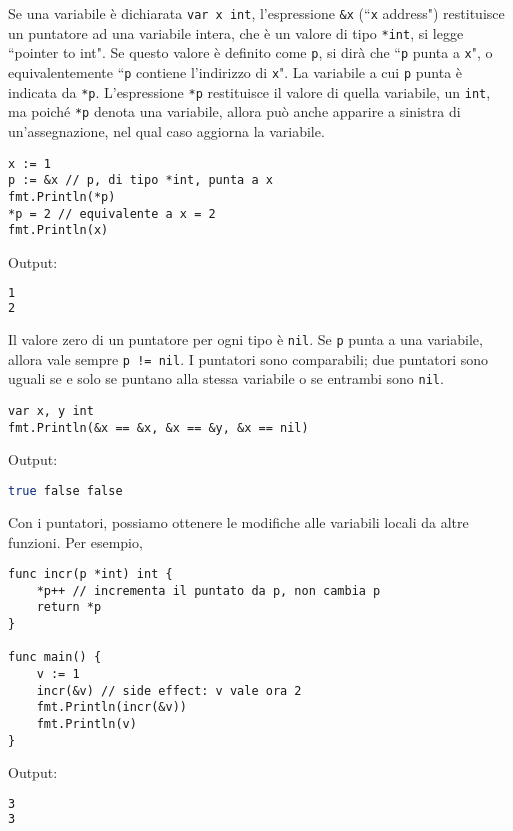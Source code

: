 \documentclass[../../../thesis.tex]{subfiles}
\begin{document}
    Se una variabile è dichiarata \verb"var x int", l'espressione \verb"&x" (``\verb"x" address") restituisce un puntatore ad una variabile intera, che è un valore di tipo \verb"*int", si legge ``pointer to int".
    Se questo valore è definito come \verb"p", si dirà che ``\verb"p" punta a \verb"x"", o equivalentemente ``\verb"p" contiene l'indirizzo di \verb"x"". La variabile a cui \verb"p" punta è indicata da \verb"*p".
    L'espressione \verb"*p" restituisce il valore di quella variabile, un \verb"int", ma poiché \verb"*p" denota una variabile, allora può anche apparire a sinistra di un'assegnazione, nel qual caso aggiorna la variabile.
    \begin{lstlisting}[frame = single, label = {lst:lstlisting1-3-2.1}]
x := 1
p := &x // p, di tipo *int, punta a x
fmt.Println(*p)
*p = 2 // equivalente a x = 2
fmt.Println(x)
    \end{lstlisting}
    Output:
    \begin{lstlisting}[language = bash, frame = L, label = {lst:lstlisting1-3-2.2}]
1
2
    \end{lstlisting}
    Il valore zero di un puntatore per ogni tipo è \verb"nil".
    Se \verb"p" punta a una variabile, allora vale sempre \verb"p != nil".
    I puntatori sono comparabili;
    due puntatori sono uguali se e solo se puntano alla stessa variabile o se entrambi sono \verb"nil".
    \begin{lstlisting}[frame = single, label = {lst:lstlisting1-3-2.3}]
var x, y int
fmt.Println(&x == &x, &x == &y, &x == nil)
    \end{lstlisting}
    Output:
    \begin{lstlisting}[language = bash, frame = L, label = {lst:lstlisting1-3-2.4}]
true false false
    \end{lstlisting}
    Con i puntatori, possiamo ottenere le modifiche alle variabili locali da altre funzioni.
    Per esempio,
    \begin{lstlisting}[frame = single, label = {lst:lstlisting1-3-2.5}]
func incr(p *int) int {
    *p++ // incrementa il puntato da p, non cambia p
    return *p
}

func main() {
    v := 1
    incr(&v) // side effect: v vale ora 2
    fmt.Println(incr(&v))
    fmt.Println(v)
}
    \end{lstlisting}
    Output:
    \begin{lstlisting}[language = bash, frame = L, label = {lst:lstlisting1-3-2.6}]
3
3
    \end{lstlisting}
\end{document}
